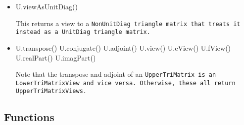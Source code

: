 \begin{itemize}
\item
\begin{tmvcode}
U.viewAsUnitDiag()
\end{tmvcode}
This returns a view to a \tt{NonUnitDiag} triangle matrix that treats it
instead as a \tt{UnitDiag} triangle matrix.

\item
\begin{tmvcode}
U.transpose()
U.conjugate()
U.adjoint()
U.view()
U.cView()
U.fView()
U.realPart()
U.imagPart()
\end{tmvcode}
Note that the transpose and adjoint of an \tt{UpperTriMatrix} is an
\tt{LowerTriMatrixView} and vice versa.  Otherwise, these all return
\tt{UpperTriMatrixView}s.

\end{itemize}

\subsection{Functions}
\label{TriMatrix_Functions}

